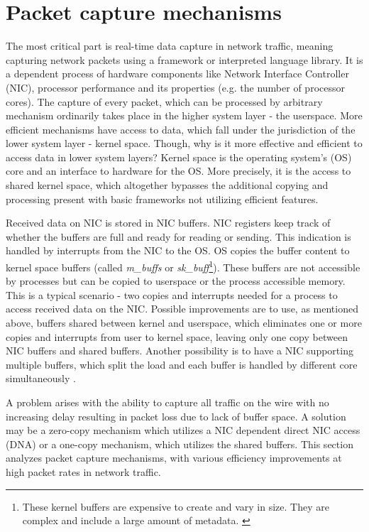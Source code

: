 \documentclass[12pt,a4paper,twoside]{book}
\begin{document}
    \section{Packet capture mechanisms} \label{analysis:mechs}
        The most critical part is real-time data capture in network traffic, meaning capturing network packets using a framework or interpreted language library. It is a dependent process of hardware components like Network Interface Controller (NIC), processor performance and its properties (e.g. the number of processor cores). The capture of every packet, which can be processed by arbitrary mechanism ordinarily takes place in the higher system layer - the userspace. More efficient mechanisms have access to data, which fall under the jurisdiction of the lower system layer - kernel space. Though, why is it more effective and efficient to access data in lower system layers? Kernel space is the operating system's (OS) core and an interface to hardware for the OS. More precisely, it is the access to shared kernel space, which altogether bypasses the additional copying and processing present with basic frameworks not utilizing efficient features.\par
        Received data on NIC is stored in NIC buffers. NIC registers keep track of whether the buffers are full and ready for reading or sending. This indication is handled by interrupts from the NIC to the OS. OS copies the buffer content to kernel space buffers (called \emph{m\_buffs} or \emph{sk\_buff}\footnote{These kernel buffers are expensive to create and vary in size. They are complex and include a large amount of metadata. \cite{video:netmap}}). These buffers are not accessible by processes but can be copied to userspace or the process accessible memory. This is a typical scenario - two copies and interrupts needed for a process to access received data on the NIC. Possible improvements are to use, as mentioned above, buffers shared between kernel and userspace, which eliminates one or more copies and interrupts from user to kernel space, leaving only one copy between NIC buffers and shared buffers. Another possibility is to have a NIC supporting multiple buffers, which split the load and each buffer is handled by different core simultaneously \cite{report:netmap}.\par
        A problem arises with the ability to capture all traffic on the wire with no increasing delay resulting in packet loss due to lack of buffer space. A solution may be a zero-copy mechanism which utilizes a NIC dependent direct NIC access (DNA) or a one-copy mechanism, which utilizes the shared buffers. This section analyzes packet capture mechanisms, with various efficiency improvements at high packet rates in network traffic.
\end{document}
